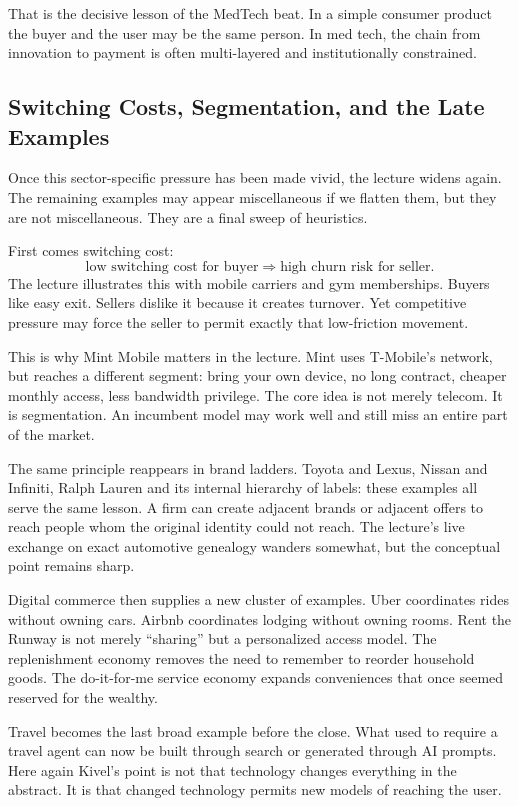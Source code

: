 That is the decisive lesson of the MedTech beat. In a simple consumer product the buyer and the user may be the same person. In med tech, the chain from innovation to payment is often multi-layered and institutionally constrained.

\subsection{Switching Costs, Segmentation, and the Late Examples}

Once this sector-specific pressure has been made vivid, the lecture widens again. The remaining examples may appear miscellaneous if we flatten them, but they are not miscellaneous. They are a final sweep of heuristics.

First comes switching cost:
\begin{equation}
\text{low switching cost for buyer}
\Rightarrow
\text{high churn risk for seller}.
\end{equation}
The lecture illustrates this with mobile carriers and gym memberships. Buyers like easy exit. Sellers dislike it because it creates turnover. Yet competitive pressure may force the seller to permit exactly that low-friction movement.

This is why Mint Mobile matters in the lecture. Mint uses T-Mobile's network, but reaches a different segment: bring your own device, no long contract, cheaper monthly access, less bandwidth privilege. The core idea is not merely telecom. It is segmentation. An incumbent model may work well and still miss an entire part of the market.

The same principle reappears in brand ladders. Toyota and Lexus, Nissan and Infiniti, Ralph Lauren and its internal hierarchy of labels: these examples all serve the same lesson. A firm can create adjacent brands or adjacent offers to reach people whom the original identity could not reach. The lecture's live exchange on exact automotive genealogy wanders somewhat, but the conceptual point remains sharp.

Digital commerce then supplies a new cluster of examples. Uber coordinates rides without owning cars. Airbnb coordinates lodging without owning rooms. Rent the Runway is not merely ``sharing'' but a personalized access model. The replenishment economy removes the need to remember to reorder household goods. The do-it-for-me service economy expands conveniences that once seemed reserved for the wealthy.

Travel becomes the last broad example before the close. What used to require a travel agent can now be built through search or generated through AI prompts. Here again Kivel's point is not that technology changes everything in the abstract. It is that changed technology permits new models of reaching the user.

